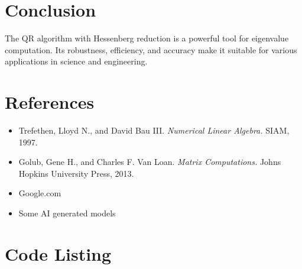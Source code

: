 \documentclass[12pt,a4paper]{article}
\begin{document}
\section{Conclusion}
The QR algorithm with Hessenberg reduction is a powerful tool for eigenvalue computation. Its robustness, efficiency, and accuracy make it suitable for various applications in science and engineering.
\section{References}
\begin{itemize}
    \item Trefethen, Lloyd N., and David Bau III. \textit{Numerical Linear Algebra.} SIAM, 1997.
    \item Golub, Gene H., and Charles F. Van Loan. \textit{Matrix Computations.} Johns Hopkins University Press, 2013.
    \item Google.com
    \item Some AI generated models
    \
\end{itemize}
\newpage
\appendix
\section{Code Listing}
\small

\end{document}
